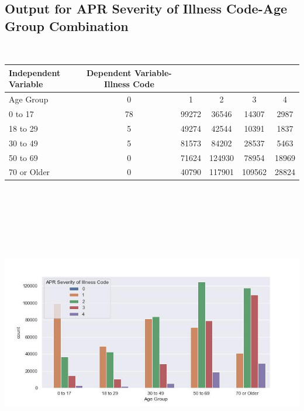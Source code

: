 \documentclass[
	letterpaper, %
]{jdf}
\begin{document}
\subsection{Output for APR Severity of Illness Code-Age Group Combination}
\ 
\begin{jdftable}
\label{table:Example}
\small %
\begin{tabular}{@{} l c c c c c}
\textbf{Independent Variable} & \textbf{Dependent Variable-Illness Code} & & & & \\
	\toprule[0.5pt]
	Age Group & 0 & 1 & 2 & 3 & 4\\
	\midrule
	0 to 17 & 78 & 99272 & 36546 & 14307 & 2987 \\
 \midrule
 18 to 29 & 5 & 49274 & 42544 & 10391 & 1837 \\
 \midrule
 30 to 49 & 5 & 81573 & 84202 & 28537 & 5463 \\
 \midrule
 50 to 69 & 0 & 71624 & 124930 & 78954 & 18969 \\
 \midrule
 70 or Older & 0 & 40790 & 117901 & 109562 & 28824 \\
\end{tabular}
\end{jdftable}

\begin{jdffigure}
\includegraphics[height=13cm]{Figures/code-age.jpg} \\
\label{fig:code-age}%
\end{jdffigure}
\end{document}
